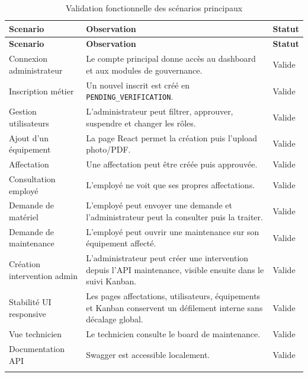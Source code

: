 ﻿\documentclass[12pt,a4paper,oneside]{report}
\begin{document}
\begin{longtable}{p{4.5cm}p{7.5cm}p{2.2cm}}
\caption{Validation fonctionnelle des scénarios principaux}\\
\toprule
\textbf{Scenario} & \textbf{Observation} & \textbf{Statut} \\
\midrule
\endfirsthead
\toprule
\textbf{Scenario} & \textbf{Observation} & \textbf{Statut} \\
\midrule
\endhead
Connexion administrateur & Le compte principal donne accès au dashboard et aux modules de gouvernance. & Valide \\
Inscription métier & Un nouvel inscrit est créé en \texttt{PENDING\_VERIFICATION}. & Valide \\
Gestion utilisateurs & L'administrateur peut filtrer, approuver, suspendre et changer les rôles. & Valide \\
Ajout d'un équipement & La page React permet la création puis l'upload photo/PDF. & Valide \\
Affectation & Une affectation peut être créée puis approuvée. & Valide \\
Consultation employé & L'employé ne voit que ses propres affectations. & Valide \\
Demande de matériel & L'employé peut envoyer une demande et l'administrateur peut la consulter puis la traiter. & Valide \\
Demande de maintenance & L'employé peut ouvrir une maintenance sur son équipement affecté. & Valide \\
Création intervention admin & L'administrateur peut créer une intervention depuis l'API maintenance, visible ensuite dans le suivi Kanban. & Valide \\
Stabilité UI responsive & Les pages affectations, utilisateurs, équipements et Kanban conservent un défilement interne sans décalage global. & Valide \\
Vue technicien & Le technicien consulte le board de maintenance. & Valide \\
Documentation API & Swagger est accessible localement. & Valide \\
\bottomrule
\label{tab:validation-fonctionnelle}
\end{longtable}
\end{document}
